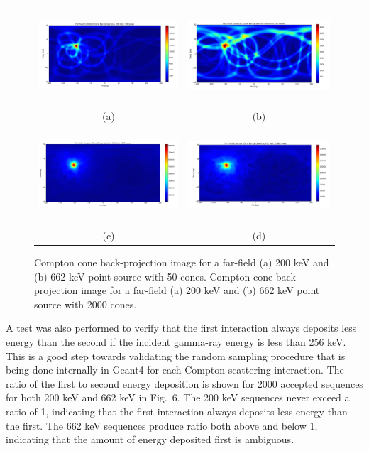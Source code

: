 \documentclass[10pt]{article}
\begin{document}
\begin{figure}[htb!]
\hypertarget{fig5}{}
\centering
\begin{tabular}{cc}
	\includegraphics[height=100pt]{Figures/Compton_200_50cones.png} & 
	\includegraphics[height=100pt]{Figures/Compton_662_50cones.png} \\ [-0.5ex]
	\scriptsize{(a)} & \scriptsize{(b)} \\ [1ex]
	\includegraphics[height=100pt]{Figures/Compton_200_2000cones.png} & 
	\includegraphics[height=100pt]{Figures/Compton_662_2000cones.png} \\ [-0.5ex]
	\scriptsize{(c)} & \scriptsize{(d)}
\end{tabular}
\caption{Compton cone back-projection image for a far-field (a) 200 keV and (b) 662 keV point source with 50 cones. Compton cone back-projection image for a far-field (a) 200 keV and (b) 662 keV point source with 2000 cones.}
\end{figure}

A test was also performed to verify that the first interaction always deposits less energy than the second if the incident gamma-ray energy is less than 256 keV. This is a good step towards validating the random sampling procedure that is being done internally in Geant4 for each Compton scattering interaction. The ratio of the first to second energy deposition is shown for 2000 accepted sequences for both 200 keV and 662 keV in Fig.~6. The 200 keV sequences never exceed a ratio of 1, indicating that the first interaction always deposits less energy than the first. The 662 keV sequences produce ratio both above and below 1, indicating that the amount of energy deposited first is ambiguous.
\end{document}
